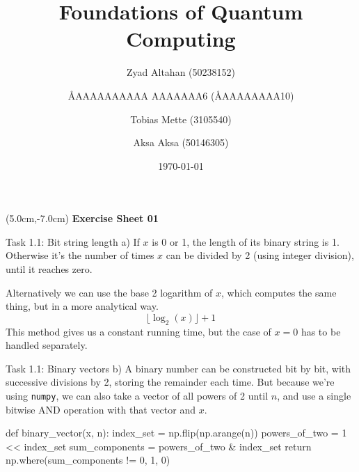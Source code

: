 \documentclass[aspectratio=169]{beamer}
\title{Foundations of Quantum Computing}
\author[]{Zyad Altahan (50238152) \and \AA{AAAAAAAAAA AAAAAAA}{6} (\AA{AAAAAAAA}{10}) \and Tobias Mette (3105540) \and Aksa Aksa (50146305)}
\institute[]{Department of Computer Science \\ University of Bonn}
\date{\today}
\begin{document}
\begin{frame}
    \titlepage
    \begin{textblock*}{8cm}(5.0cm,-7.0cm)
        {\large \color{uwopurple}\hspace{0.66cm} \textbf{Exercise Sheet 01}} %
    \end{textblock*}
\end{frame}


\begin{frame}{Task 1.1: Bit string length}
    a) If $x$ is 0 or 1, the length of its binary string is 1.
    Otherwise it's the number of times $x$ can be divided by 2 (using integer division), until it reaches zero.

    Alternatively we can use the base 2 logarithm of $x$, which computes the same thing, but in a more analytical way.
    \[ \lfloor\log_2(x)\rfloor + 1\]
    This method gives us a constant running time, but the case of $x=0$ has to be handled separately.
\end{frame}

\begin{frame}[fragile]{Task 1.1: Binary vectors}
    b) A binary number can be constructed bit by bit, with successive divisions by 2, storing the remainder each time.
    But because we're using \texttt{numpy}, we can also take a vector of all powers of 2 until $n$,
    and use a single bitwise AND operation with that vector and $x$.
    \begin{mylisting}
        def binary_vector(x, n):
            index_set = np.flip(np.arange(n))
            powers_of_two = 1 << index_set
            sum_components = powers_of_two & index_set
            return np.where(sum_components != 0, 1, 0)
    \end{mylisting}
\end{frame}
\end{document}
